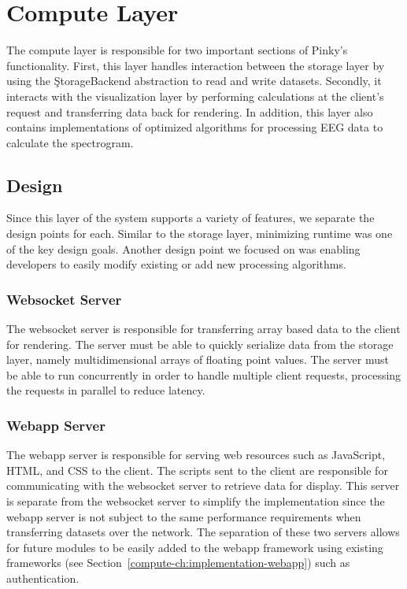 \chapter{Compute Layer}\label{compute-ch}

The compute layer is responsible for two important sections of Pinky's
functionality. First, this layer handles interaction between the storage layer
by using the \c{StorageBackend} abstraction to read and write datasets.
Secondly, it interacts with the visualization layer by performing calculations
at the client's request and transferring data back for rendering. In addition,
this layer also contains implementations of optimized algorithms for processing
EEG data to calculate the spectrogram.

\section{Design}

Since this layer of the system supports a variety of features, we separate the
design points for each. Similar to the storage layer, minimizing runtime was
one of the key design goals. Another design point we focused on was enabling
developers to easily modify existing or add new processing algorithms.

\subsection{Websocket Server}

The websocket server is responsible for transferring array based data to the
client for rendering. The server must be able to quickly serialize data from
the storage layer, namely multidimensional arrays of floating point values. The
server must be able to run concurrently in order to handle multiple client
requests, processing the requests in parallel to reduce latency.

\subsection{Webapp Server}

The webapp server is responsible for serving web resources such as JavaScript,
HTML, and CSS to the client. The scripts sent to the client are responsible for
communicating with the websocket server to retrieve data for display. This
server is separate from the websocket server to simplify the implementation
since the webapp server is not subject to the same performance requirements
when transferring datasets over the network. The separation of these two
servers allows for future modules to be easily added to the webapp framework
using existing frameworks (see Section~\ref{compute-ch:implementation-webapp})
such as authentication.

